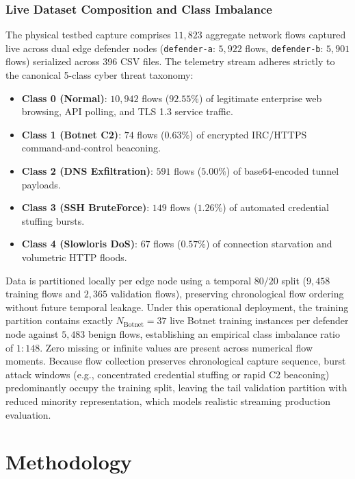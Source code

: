 \documentclass[journal,10pt,twocolumn]{IEEEtran}
\begin{document}
\subsubsection{Live Dataset Composition and Class Imbalance}
The physical testbed capture comprises $11{,}823$ aggregate network flows captured live across dual edge defender nodes (\texttt{defender-a}: $5{,}922$ flows, \texttt{defender-b}: $5{,}901$ flows) serialized across 396 CSV files. The telemetry stream adheres strictly to the canonical 5-class cyber threat taxonomy:
\begin{itemize}
    \item \textbf{Class 0 (Normal)}: $10{,}942$ flows ($92.55\%$) of legitimate enterprise web browsing, API polling, and TLS 1.3 service traffic.
    \item \textbf{Class 1 (Botnet C2)}: $74$ flows ($0.63\%$) of encrypted IRC/HTTPS command-and-control beaconing.
    \item \textbf{Class 2 (DNS Exfiltration)}: $591$ flows ($5.00\%$) of base64-encoded tunnel payloads.
    \item \textbf{Class 3 (SSH BruteForce)}: $149$ flows ($1.26\%$) of automated credential stuffing bursts.
    \item \textbf{Class 4 (Slowloris DoS)}: $67$ flows ($0.57\%$) of connection starvation and volumetric HTTP floods.
\end{itemize}
Data is partitioned locally per edge node using a temporal $80/20$ split ($9{,}458$ training flows and $2{,}365$ validation flows), preserving chronological flow ordering without future temporal leakage. Under this operational deployment, the training partition contains exactly $N_{\text{Botnet}} = 37$ live Botnet training instances per defender node against $5{,}483$ benign flows, establishing an empirical class imbalance ratio of $1 : 148$. Zero missing or infinite values are present across numerical flow moments. Because flow collection preserves chronological capture sequence, burst attack windows (e.g., concentrated credential stuffing or rapid C2 beaconing) predominantly occupy the training split, leaving the tail validation partition with reduced minority representation, which models realistic streaming production evaluation.

\section{Methodology}
\end{document}
